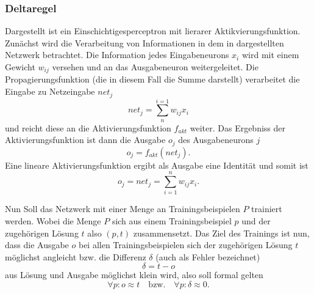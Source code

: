 \subsubsection{Deltaregel}\label{sec:deltaregel}


Dargestellt ist ein Einschichtigesperceptron mit lierarer Aktikvierungsfunktion.
Zunächst wird die Verarbeitung von Informationen in dem in  dargestellten Netzwerk betrachtet. Die Information jedes Eingabeneurons $x_i$ wird mit einem Gewicht $w_{ij}$ versehen und an das Ausgabeneuron weitergeleitet. Die Propagierungsfunktion (die in diesem Fall die Summe darstellt) verarbeitet die Eingabe zu Netzeingabe $net_j$
\begin{equation}
net_j= \sum^{i=1}_n w_{ij} x_i
\end{equation}
und reicht diese an die Aktivierungsfunktion $f_{akt}$ weiter. Das Ergebniss der Aktivierungsfunktion ist dann die Ausgabe $o_j$ des Ausgabeneurons $j$
\begin{equation}
o_j= f_{akt}(net_j).
\end{equation}
Eine lineare Aktivierungsfunktion ergibt als Ausgabe eine Identität und somit ist
\begin{equation}
o_j= net_j= \sum_{i=1}^n w_{ij} x_i.
\label{gl:ausgang}
\end{equation}

Nun Soll das Netzwerk mit einer Menge an Trainingsbeispielen $P$ trainiert werden. Wobei die Menge $P$ sich aus einem Trainingsbeispiel $p$ und der zugehörigen Lösung $t$ also $(p,t)$ zusammensetzt.
Das Ziel des Trainings ist nun, dass die Ausgabe $o$ bei allen Trainingsbeispielen sich der zugehörigen Lösung $t$ möglichst angleicht bzw. die Differenz $\delta$ (auch als Fehler bezeichnet) 
\begin{equation}
\delta=t-o
\label{gl:delta}
\end{equation}
%
aus Lösung und Ausgabe möglichst klein  wird, also soll formal gelten
\begin{equation*}
\forall p:o \approx t \quad \text{bzw.} \quad \forall p:\delta \approx 0.
\end{equation*}

